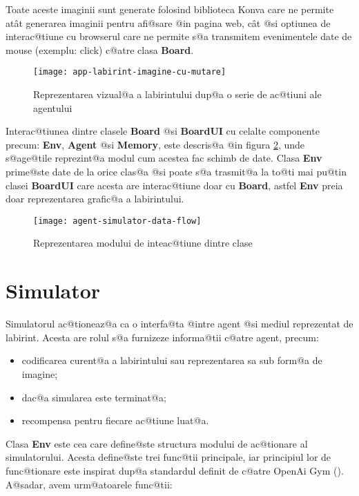 Toate aceste imaginii sunt generate folosind biblioteca Konva care ne permite at\^ at generarea imaginii pentru afi@sare @in pagina web, c\^ at @si optiunea de interac@tiune cu browserul care ne permite s@a transmitem evenimentele date de mouse (exemplu: click) c@atre clasa \textbf{Board}.

\begin{figure}[h]
	\centering
	\texttt{[image: app-labirint-imagine-cu-mutare]}
	\caption{Reprezentarea vizual@a a labirintului dup@a o serie de ac@tiuni ale agentului}
	\label{fig:labirint-imagine-cu-mutare}
\end{figure}

Interac@tiunea dintre clasele \textbf{Board} @si \textbf{BoardUI} cu celalte componente precum: \textbf{Env}, \textbf{Agent} @si \textbf{Memory}, este descris@a @in figura \ref{fig:agent-simulator-data-flow}, unde s@age@tile reprezint@a modul cum acestea fac schimb de date. Clasa \textbf{Env} prime@ste date de la orice clas@a @si poate s@a trasmit@a la to@ti mai pu@tin clasei \textbf{BoardUI} care acesta are interac@tiune doar cu \textbf{Board}, astfel \textbf{Env} preia doar reprezentarea grafic@a a labirintului.

\begin{figure}[h]
	\centering
	\texttt{[image: agent-simulator-data-flow]}
	\caption{Reprezentarea modului de inteac@tiune dintre clase}
	\label{fig:agent-simulator-data-flow}
\end{figure}





\section{Simulator}


Simulatorul ac@tioneaz@a ca o interfa@ta @intre agent @si mediul reprezentat de labirint. Acesta are rolul s@a furnizeze informa@tii c@atre agent, precum: 

\begin{itemize}
 \item codificarea curent@a a labirintului sau reprezentarea sa sub form@a de imagine;
 \item dac@a simularea este terminat@a;
 \item recompensa pentru fiecare ac@tiune luat@a.
\end{itemize}

Clasa \textbf{Env} este cea care define@ste structura modului de ac@tionare al simulatorului. Acesta define@ste trei func@tii principale, iar principiul lor de func@tionare este inspirat dup@a standardul definit de c@atre OpenAi Gym (\cite{open-ai-gym-env-format}). A@sadar, avem urm@atoarele func@tii:

